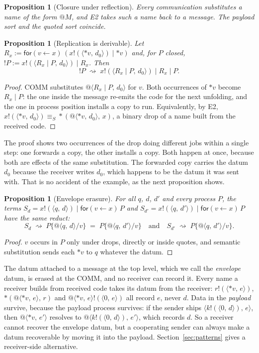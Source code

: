 \documentclass[11pt,a4paper]{article}
\makeatletter
\theoremstyle{plain}
\newtheorem{proposition}[theorem]{Proposition}
\theoremstyle{definition}
\theoremstyle{remark}
\newcommand{\pr}[2]{\langle #1,\,#2\rangle}
\newcommand{\qn}[2]{@\langle #1,\,#2\rangle}
\newcommand{\out}[2]{#1!(#2)}
\newcommand{\rcv}[3]{\mathsf{for}(#1 \leftarrow #2)\,#3}
\newcommand{\drop}[1]{{*}#1}
\newcommand{\bdrop}[2]{{*}(#1,\,#2)}
\newcommand{\red}{\rightsquigarrow}
\newcommand{\scong}{\equiv_{S}}
\newcommand{\ssub}[2]{\{#1/#2\}}
\makeatother
\begin{document}
\begin{proposition}[Closure under reflection]
Every communication substitutes a name of the form $@M$, and E2 takes such a
name back to a message. The payload sort and the quoted sort coincide.
\end{proposition}

\begin{proposition}[Replication is derivable]\label{prop:repl}
Let $R_x := \rcv{v}{x}{(\out{x}{\pr{\drop{v}}{d_0}}\mid\drop{v})}$ and, for $P$
closed, $!P := \out{x}{\pr{R_x\mid P}{d_0}}\mid R_x$. Then
\[
  !P \;\red\; \out{x}{\pr{R_x\mid P}{d_0}}\mid R_x\mid P .
\]
\end{proposition}

\begin{proof}
COMM substitutes $\qn{R_x\mid P}{d_0}$ for $v$. Both occurrences of
$\drop{v}$ become $R_x\mid P$: the one inside the message re-emits the code
for the next unfolding, and the one in process position installs a copy to
run. Equivalently, by E2, $\out{x}{\pr{\drop{v}}{d_0}}\scong
\bdrop{\qn{\drop{v}}{d_0}}{x}$, a binary drop of a name built from the
received code.
\end{proof}

The proof shows two occurrences of the drop doing different jobs within a
single step: one forwards a copy, the other installs a copy. Both happen at
once, because both are effects of the same substitution. The forwarded copy
carries the datum $d_0$ because the receiver writes $d_0$, which happens to be
the datum it was sent with. That is no accident of the example, as the next
proposition shows.

\begin{proposition}[Envelope erasure]\label{prop:envelope}
For all $q$, $d$, $d'$ and every process $P$, the terms
$S_d=\out{x}{\pr{q}{d}}\mid\rcv{v}{x}{P}$ and
$S_{d'}=\out{x}{\pr{q}{d'}}\mid\rcv{v}{x}{P}$ have the same reduct:
\[
  S_d\;\red\;P\ssub{\qn{q}{d}}{v}\;=\;P\ssub{\qn{q}{d'}}{v}\quad\text{and}\quad S_{d'}\;\red\;P\ssub{\qn{q}{d'}}{v}.
\]
\end{proposition}

\begin{proof}
$v$ occurs in $P$ only under drops, directly or inside quotes, and semantic
substitution sends each $\drop{v}$ to $q$ whatever the datum.
\end{proof}

The datum attached to a message at the top level, which we call the
\emph{envelope} datum, is erased at the COMM, and no receiver can record it.
Every name a receiver builds from received code takes its datum from the
receiver: $\out{r}{\pr{\drop{v}}{e}}$, $\bdrop{\qn{\drop{v}}{e}}{r}$ and
$\out{\qn{\drop{v}}{e}}{\pr{0}{e}}$ all record $e$, never $d$. Data in the
\emph{payload} survive, because the payload process survives: if the sender
ships $\pr{\out{k}{\pr{0}{d}}}{e}$, then $\qn{\drop{v}}{e'}$ resolves to
$\qn{\out{k}{\pr{0}{d}}}{e'}$, which records $d$. So a receiver cannot recover
the envelope datum, but a cooperating sender can always make a datum
recoverable by moving it into the payload. Section~\ref{sec:patterns} gives a
receiver-side alternative.
\end{document}

